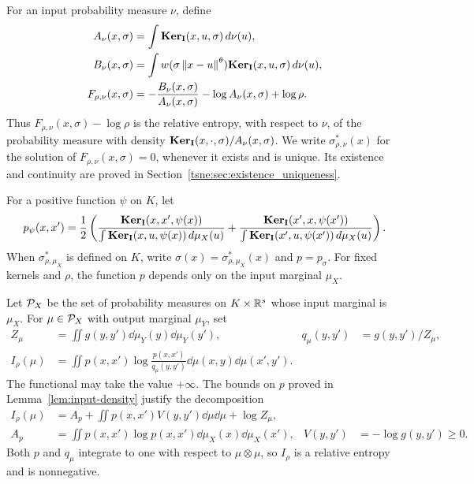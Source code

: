 For an input probability measure $\nu$, define
\begin{align}\label{eq:input-normalizers}
A_\nu(x,\sigma)&=\int\mathbf{Ker}_{\mathbf{I}}(x,u,\sigma)\,d\nu(u),\\
B_\nu(x,\sigma)&=\int w(\sigma\left\lVert x-u\right\rVert^\theta)\mathbf{Ker}_{\mathbf{I}}(x,u,\sigma)\,d\nu(u),\\
F_{\rho,\nu}(x,\sigma)&=-\frac{B_\nu(x,\sigma)}{A_\nu(x,\sigma)}
-\log A_\nu(x,\sigma)+\log\rho.\label{eq:entropy-functional}
\end{align}
Thus $F_{\rho,\nu}(x,\sigma)-\log\rho$ is the relative entropy, with respect to $\nu$, of the probability measure with density $\mathbf{Ker}_{\mathbf{I}}(x,\cdot,\sigma)/A_\nu(x,\sigma)$. We write $\sigma^*_{\rho,\nu}(x)$ for the solution of $F_{\rho,\nu}(x,\sigma)=0$, whenever it exists and is unique. Its existence and continuity are proved in Section~\ref{tsne:sec:existence_uniqueness}.

For a positive function $\psi$ on $K$, let
\begin{align}\label{eq:continuum-input}
p_\psi(x,x')=\frac12\left(
\frac{\mathbf{Ker}_{\mathbf{I}}(x,x',\psi(x))}{\int\mathbf{Ker}_{\mathbf{I}}(x,u,\psi(x))\,d\mu_X(u)}
+\frac{\mathbf{Ker}_{\mathbf{I}}(x',x,\psi(x'))}{\int\mathbf{Ker}_{\mathbf{I}}(x',u,\psi(x'))\,d\mu_X(u)}\right).
\end{align}
When $\sigma^*_{\rho,\mu_X}$ is defined on $K$, write $\sigma(x)=\sigma^*_{\rho,\mu_X}(x)$ and $p=p_\sigma$. For fixed kernels and $\rho$, the function $p$ depends only on the input marginal $\mu_X$.

Let $\mathcal P_X$ be the set of probability measures on $K\times\mathbb{R}^s$ whose input marginal is $\mu_X$. For $\mu\in\mathcal P_X$ with output marginal $\mu_Y$, set
\begin{align}\label{eq:continuum-output}
Z_\mu&=\iint g(y,y')\dd\mu_Y(y)\dd\mu_Y(y'),
& q_\mu(y,y')&=g(y,y')/Z_\mu,\\
I_\rho(\mu)&=\iint p(x,x')\log\frac{p(x,x')}{q_\mu(y,y')}
\dd\mu(x,y)\dd\mu(x',y').\label{eq:continuum-objective}
\end{align}
The functional may take the value $+\infty$. The bounds on $p$ proved in Lemma~\ref{lem:input-density} justify the decomposition
\begin{align}\label{eq:energy-decomposition}
I_\rho(\mu)&=A_p+\iint p(x,x')V(y,y')\dd\mu\dd\mu+\log Z_\mu,\\
A_p&=\iint p(x,x')\log p(x,x')\dd\mu_X(x)\dd\mu_X(x'),
& V(y,y')&=-\log g(y,y')\geq0.\nonumber
\end{align}
Both $p$ and $q_\mu$ integrate to one with respect to $\mu\otimes\mu$, so $I_\rho$ is a relative entropy and is nonnegative.

